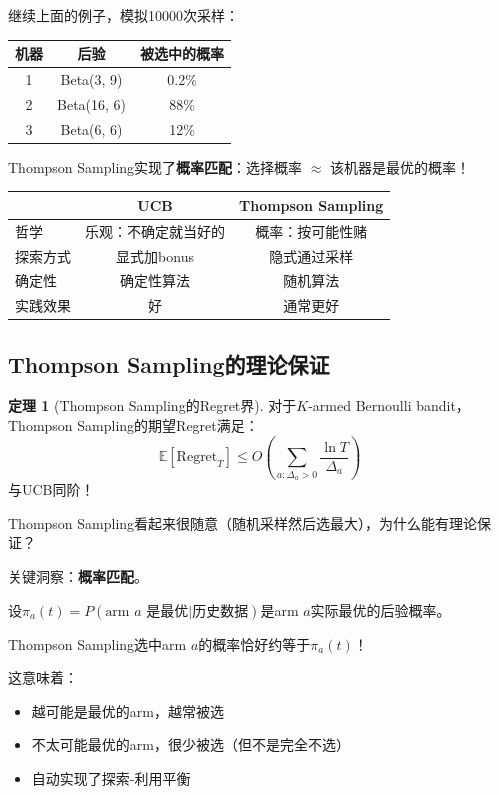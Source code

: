 \documentclass[11pt,a4paper]{article}
\theoremstyle{definition}
\newtheorem{theorem}{定理}[section]
\begin{document}
\begin{calculation}
继续上面的例子，模拟10000次采样：

\begin{center}
\begin{tabular}{c|c|c}
\toprule
机器 & 后验 & 被选中的概率 \\
\midrule
1 & Beta(3, 9) & 0.2\% \\
2 & Beta(16, 6) & 88\% \\
3 & Beta(6, 6) & 12\% \\
\bottomrule
\end{tabular}
\end{center}

Thompson Sampling实现了\textbf{概率匹配}：选择概率 $\approx$ 该机器是最优的概率！
\end{calculation}

\begin{keypoint}
\begin{center}
\begin{tabular}{l|c|c}
\toprule
& UCB & Thompson Sampling \\
\midrule
哲学 & 乐观：不确定就当好的 & 概率：按可能性赌 \\
探索方式 & 显式加bonus & 隐式通过采样 \\
确定性 & 确定性算法 & 随机算法 \\
实践效果 & 好 & 通常更好 \\
\bottomrule
\end{tabular}
\end{center}
\end{keypoint}

\subsection{Thompson Sampling的理论保证}

\begin{theorem}[Thompson Sampling的Regret界]
对于$K$-armed Bernoulli bandit，Thompson Sampling的期望Regret满足：
\[
\mathbb{E}[\text{Regret}_T] \leq O\left(\sum_{a:\Delta_a > 0} \frac{\ln T}{\Delta_a}\right)
\]
与UCB同阶！
\end{theorem}

\begin{plainwords}
Thompson Sampling看起来很随意（随机采样然后选最大），为什么能有理论保证？

关键洞察：\textbf{概率匹配}。

设$\pi_a(t) = P(\text{arm } a \text{ 是最优} | \text{历史数据})$是arm $a$实际最优的后验概率。

Thompson Sampling选中arm $a$的概率恰好约等于$\pi_a(t)$！

这意味着：
\begin{itemize}
    \item 越可能是最优的arm，越常被选
    \item 不太可能最优的arm，很少被选（但不是完全不选）
    \item 自动实现了探索-利用平衡
\end{itemize}
\end{plainwords}
\end{document}
